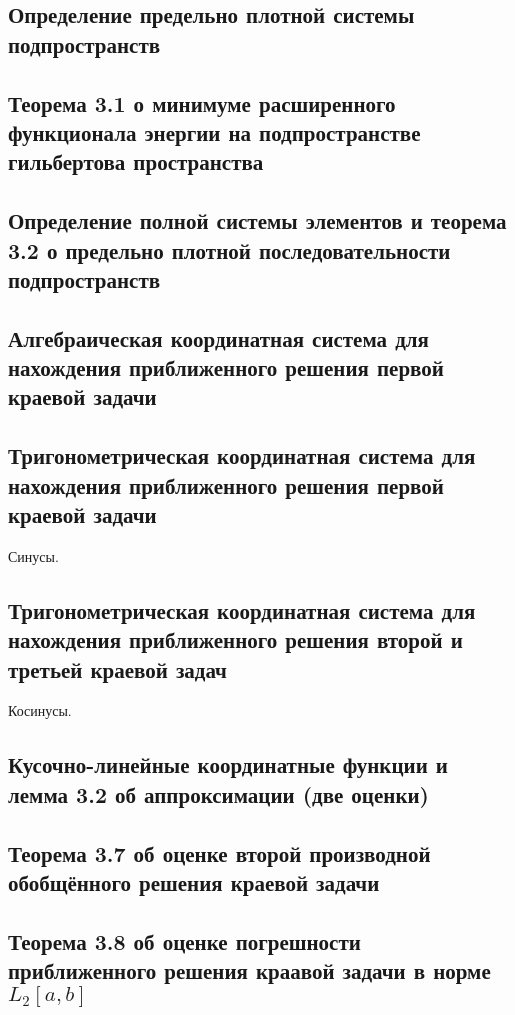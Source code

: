 \documentclass[a4paper,14pt]{article} %
\begin{document}
\subsection{Определение предельно плотной системы подпространств}

\subsection{Теорема 3.1 о минимуме расширенного функционала энергии на подпространстве гильбертова пространства}

\subsection{Определение полной системы элементов и теорема 3.2 о предельно плотной последовательности подпространств}

\subsection{Алгебраическая координатная система для нахождения приближенного решения первой краевой задачи}

\subsection{Тригонометрическая координатная система для нахождения приближенного решения первой краевой задачи}
Синусы.

\subsection{Тригонометрическая координатная система для нахождения приближенного решения второй и третьей краевой задач}
Косинусы.

\subsection{Кусочно-линейные координатные функции и лемма 3.2 об аппроксимации (две оценки)}

\subsection{Теорема 3.7 об оценке второй производной обобщённого решения краевой задачи}

\subsection{Теорема 3.8 об оценке погрешности приближенного решения краавой задачи в норме $L_2[a,b]$}
\end{document}
